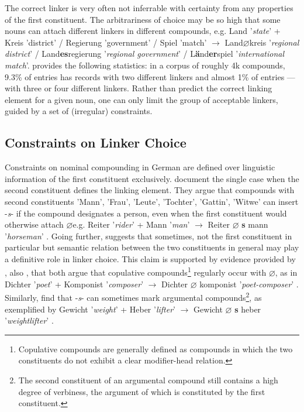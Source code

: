 \documentclass[10pt, a4paper]{article}
\newcommand{\zeroLinker}{\ensuremath{\boldsymbol{\varnothing}}}
\newcommand{\compEx}[7]{%
    #1 '\textit{#2}' + #4 '\textit{#5}'
    $\rightarrow$
    \if\relax\detokenize{#6}\relax
      #1%
    \else
      #6%
    \fi
    \if\relax\detokenize{#3}\relax
      \zeroLinker%
    \else
      \textbf{#3}%
    \fi
    \MakeLowercase{#4} '\textit{#7}'%
}
\begin{document}
The correct linker is very often not inferrable with certainty from any properties of the first constituent. The arbitrariness of choice may be so high that some nouns can attach different linkers in different compounds, e.g. Land '\textit{state}' + Kreis 'district' / Regierung 'government' / Spiel 'match' $\rightarrow$ Land{\zeroLinker}kreis '\textit{regional district}' / Land{\textbf{es}}regierung '\textit{regional government}' / L\textbf{ä}nd{\textbf{er}}spiel '\textit{international match}'. \citet[134]{augst_1975} provides the following statistics: in a corpus of roughly 4k compounds, 9.3\% of entries has records with two different linkers and almost 1\% of entries --- with three or four different linkers. Rather than predict the correct linking element for a given noun, one can only limit the group of acceptable linkers, guided by a set of (irregular) constraints.


\subsection{Constraints on Linker Choice}
\label{sec:constr}

Constraints on nominal compounding in German are defined over linguistic information of the first constituent exclusively. \citet[56]{ortner_mueller-bollhagen_1991} document the single case when the second constituent defines the linking element. They argue that compounds with second constituents 'Mann', 'Frau', 'Leute', 'Tochter', 'Gattin', 'Witwe' can insert -\textit{s}- if the compound designates a person, even when the first constituent would otherwise attach \zeroLinker e.g. \compEx{Reiter}{rider}{s}{Mann}{man}{}{horseman}. Going further, \citet[227]{eisenberg_2013} suggests that sometimes, not the first constituent in particular but semantic relation between the two constituents in general may play a definitive role in linker choice. This claim is supported by evidence provided by \citet{koliopoulou_2014}, also \citet{neef_borgwaldt_2012}, that both argue that copulative compounds\footnote{Copulative compounds are generally defined as compounds in which the two constituents do not exhibit a clear modifier-head relation.} regularly occur with \zeroLinker, as in \compEx{Dichter}{poet}{}{Komponist}{composer}{}{poet-composer}. Similarly, \cite{nuebling_szczepaniak_2013} find that -\textit{s}- can sometimes mark argumental compounds\footnote{The second constituent of an argumental compound still contains a high degree of verbiness, the argument of which is constituted by the first constituent.}, as exemplified by \compEx{Gewicht}{weight}{s}{Heber}{lifter}{}{weightlifter}.
\end{document}
